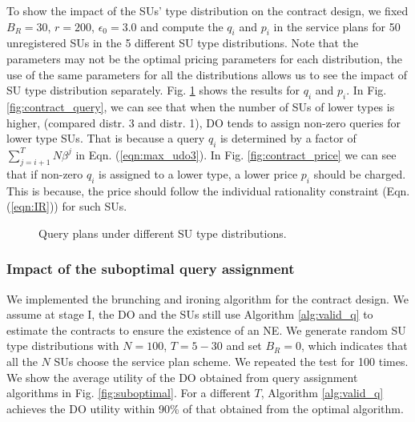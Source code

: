 \documentclass[journal]{IEEEtran}
\begin{document}
To show the impact of the SUs' type distribution on the contract design, we fixed $B_R=30$, $r=200$, $\epsilon_0=3.0$ and compute the $q_i$ and $p_i$ in the service plans for 50 unregistered SUs in the 5 different SU type distributions. Note that the parameters may not be the optimal pricing parameters for each distribution, the use of the same parameters for all the distributions allows us to see the impact of SU type distribution separately. Fig. \ref{fig:contract} shows the results for $q_i$ and $p_i$. In Fig. \ref{fig:contract_query}, we can see that when the number of SUs of lower types is higher, (compared distr. 3 and distr. 1), DO tends to assign non-zero queries for lower type SUs. That is because a query $q_i$ is determined by a factor of $\sum_{j=i+1}^TN\beta^j$ in Eqn. (\ref{eqn:max_udo3}). In Fig. \ref{fig:contract_price} we can see that if non-zero $q_i$ is assigned to a lower type, a lower price $p_i$ should be charged. This is because, the price should follow the individual rationality constraint (Eqn. (\ref{eqn:IR})) for such SUs.

\begin{figure}[t]
\centering
{}\caption{Query plans under different SU type distributions.}
\label{fig:contract}
\vspace{-0.0cm}
\end{figure}

\subsubsection{Impact of the suboptimal query assignment}

We implemented the brunching and ironing algorithm \cite{contract_book} for the contract design. We assume at stage I, the DO and the SUs still use Algorithm \ref{alg:valid_q} to estimate the contracts to ensure the existence of an NE. We generate random SU type distributions with $N=100$, $T=5-30$ and set $B_R=0$, which indicates that all the $N$ SUs choose the service plan scheme. We repeated the test for 100 times. We show the average utility of the DO obtained from query assignment algorithms in Fig. \ref{fig:suboptimal}. For a different $T$, Algorithm \ref{alg:valid_q} achieves the DO utility within 90\% of that obtained from the optimal algorithm.
\end{document}
